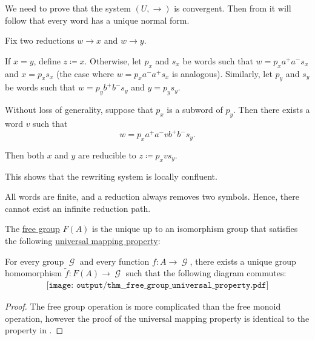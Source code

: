\begin{defproof}
  We need to prove that the system \( (U, \to) \) is convergent. Then from  it will follow that every word has a unique normal form.

   Fix two reductions \( w \to x \) and \( w \to y \).

  If \( x = y \), define \( z \coloneqq x \). Otherwise, let \( p_x \) and \( s_x \) be words such that \( w = p_x a^+ a^- s_x \) and \( x = p_x s_x \) (the case where \( w = p_x a^- a^+ s_x \) is analogous). Similarly, let \( p_y \) and \( s_y \) be words such that \( w = p_y b^+ b^- s_y \) and \( y = p_y s_y \).

  Without loss of generality, suppose that \( p_x \) is a subword of \( p_y \). Then there exists a word \( v \) such that
  \begin{equation*}
    w = p_x a^+ a^- v b^+ b^- s_y.
  \end{equation*}

  Then both \( x \) and \( y \) are reducible to \( z \coloneqq p_x v s_y \).

  This shows that the rewriting system is locally confluent.

   All words are finite, and a reduction always removes two symbols. Hence, there cannot exist an infinite reduction path.
\end{defproof}

\begin{proposition}\label{thm:free_group_universal_property}
  The \hyperref[def:free_group]{free group} \( F(A) \) is the unique up to an isomorphism group that satisfies the following \hyperref[rem:universal_mapping_property]{universal mapping property}:
  \begin{displayquote}
    For every group \( \mscrG \) and every function \( f: A \to \mscrG \), there exists a unique group homomorphism \( \widetilde{f}: F(A) \to \mscrG \) such that the following diagram commutes:
    \begin{equation}\label{eq:thm:free_group_universal_property/diagram}
      \begin{aligned}
        \texttt{[image: output/thm\_\_free\_group\_universal\_property.pdf]}
      \end{aligned}
    \end{equation}
  \end{displayquote}
\end{proposition}
\begin{proof}
  The free group operation is more complicated than the free monoid operation, however the proof of the universal mapping property is identical to the property in .
\end{proof}


